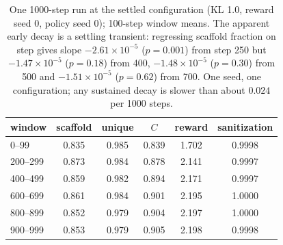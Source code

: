 \documentclass[10pt,letterpaper]{article}
\begin{document}
\begin{table}[!htbp]\centering
\caption{One 1000-step run at the settled configuration (KL 1.0, reward seed 0, policy seed 0); 100-step window means. The apparent early decay is a settling transient: regressing scaffold fraction on step gives slope $-2.61\times10^{-5}$ ($p=0.001$) from step 250 but $-1.47\times10^{-5}$ ($p=0.18$) from 400, $-1.48\times10^{-5}$ ($p=0.30$) from 500 and $-1.51\times10^{-5}$ ($p=0.62$) from 700. One seed, one configuration; any sustained decay is slower than about $0.024$ per 1000 steps.}
\label{tab:s9}
\begin{tabular}{@{}lccccc@{}}\toprule
window & scaffold & unique & $C$ & reward & sanitization\\\midrule
0--99 & 0.835 & 0.985 & 0.839 & 1.702 & 0.9998\\
200--299 & 0.873 & 0.984 & 0.878 & 2.141 & 0.9997\\
400--499 & 0.859 & 0.982 & 0.894 & 2.171 & 0.9997\\
600--699 & 0.861 & 0.984 & 0.901 & 2.195 & 1.0000\\
800--899 & 0.852 & 0.979 & 0.904 & 2.197 & 1.0000\\
900--999 & 0.853 & 0.979 & 0.905 & 2.198 & 0.9998\\\bottomrule
\end{tabular}
\end{table}
\end{document}
